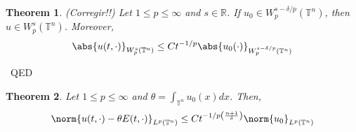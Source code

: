 \documentclass[11pt]{article}
\newtheorem{theorem}{Theorem}
\newenvironment{proof}{{\sc Proof:}}{~\hfill QED}
\newcommand{\LT}[1]{L^{#1}(\mathbb{T}^n)}
\begin{document}
\begin{theorem}
(Corregir!!)	Let $1 \le p \le \infty$ and $s \in \mathbb{R}$. If $u_0 \in W^{s-\delta/p}_p (\mathbb{T}^n)$, then $u \in W^{s}_p (\mathbb{T}^n)$. Moreover, $$\abs{u(t,\cdot)}_{W^{s}_p (\mathbb{T}^n)} \le Ct^{-1/p}\abs{u_0(\cdot)}_{W^{s-\delta/p}_p (\mathbb{T}^n)} $$
\end{theorem}
\begin{proof}

\end{proof}
\begin{theorem}\label{thmperfilasintoticolineal}
	Let $1 \le p \le \infty$ and $\theta=\int_{\mathbb{T}^n}u_0(x)dx$. Then,
	\begin{equation*}
		\norm{u(t,\cdot)-\theta E(t,\cdot)}_{\LT{p}} \le C t^{-1/p\left(\frac{n+1}{\delta}\right)}\norm{u_0}_{\LT{p}}
	\end{equation*}
\end{theorem}
\end{document}
